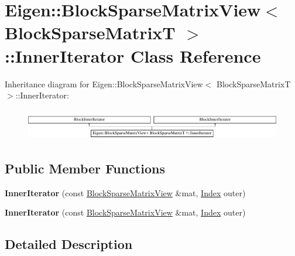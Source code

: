 \hypertarget{class_eigen_1_1_block_sparse_matrix_view_1_1_inner_iterator}{}\section{Eigen\+:\+:Block\+Sparse\+Matrix\+View$<$ Block\+Sparse\+MatrixT $>$\+:\+:Inner\+Iterator Class Reference}
\label{class_eigen_1_1_block_sparse_matrix_view_1_1_inner_iterator}
Inheritance diagram for Eigen\+:\+:Block\+Sparse\+Matrix\+View$<$ Block\+Sparse\+MatrixT $>$\+:\+:Inner\+Iterator\+:\begin{figure}[H]
\begin{center}
\leavevmode
\includegraphics[height=1.386139cm]{class_eigen_1_1_block_sparse_matrix_view_1_1_inner_iterator}
\end{center}
\end{figure}
\subsection*{Public Member Functions}
\begin{DoxyCompactItemize}
\item 
\mbox{\label{class_eigen_1_1_block_sparse_matrix_view_1_1_inner_iterator_ab96f2ec421e67ef9b22dff4d72a4fedd}} 
{\bfseries Inner\+Iterator} (const \hyperlink{class_eigen_1_1_block_sparse_matrix_view}{Block\+Sparse\+Matrix\+View} \&mat, \hyperlink{group___core___module_a554f30542cc2316add4b1ea0a492ff02}{Index} outer)
\item 
\mbox{\label{class_eigen_1_1_block_sparse_matrix_view_1_1_inner_iterator_ab96f2ec421e67ef9b22dff4d72a4fedd}} 
{\bfseries Inner\+Iterator} (const \hyperlink{class_eigen_1_1_block_sparse_matrix_view}{Block\+Sparse\+Matrix\+View} \&mat, \hyperlink{group___core___module_a554f30542cc2316add4b1ea0a492ff02}{Index} outer)
\end{DoxyCompactItemize}


\subsection{Detailed Description}
